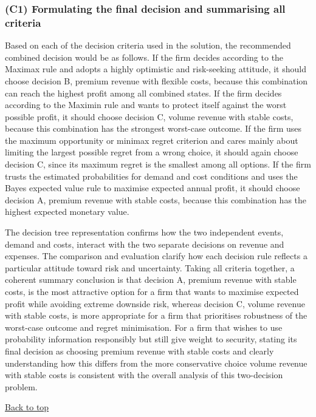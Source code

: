 \subsubsection{(C1) Formulating the final decision and summarising all criteria}\label{subsubsec:example3-c1}

Based on each of the decision criteria used in the solution, the recommended combined decision would be as follows. If the
firm decides according to the Maximax rule and adopts a highly optimistic and risk-seeking attitude, it should choose
decision B, premium revenue with flexible costs, because this combination can reach the highest profit among all combined
states. If the firm decides according to the Maximin rule and wants to protect itself against the worst possible profit, it
should choose decision C, volume revenue with stable costs, because this combination has the strongest worst-case outcome.
If the firm uses the maximum opportunity or minimax regret criterion and cares mainly about limiting the largest possible
regret from a wrong choice, it should again choose decision C, since its maximum regret is the smallest among all options.
If the firm trusts the estimated probabilities for demand and cost conditions and uses the Bayes expected value rule to
maximise expected annual profit, it should choose decision A, premium revenue with stable costs, because this combination
has the highest expected monetary value.

\medskip
The decision tree representation confirms how the two independent events, demand and costs, interact with the two separate
decisions on revenue and expenses. The comparison and evaluation clarify how each decision rule reflects a particular
attitude toward risk and uncertainty. Taking all criteria together, a coherent summary conclusion is that decision A,
premium revenue with stable costs, is the most attractive option for a firm that wants to maximise expected profit while
avoiding extreme downside risk, whereas decision C, volume revenue with stable costs, is more appropriate for a firm that
prioritises robustness of the worst-case outcome and regret minimisation. For a firm that wishes to use probability
information responsibly but still give weight to security, stating its final decision as choosing premium revenue with
stable costs and clearly understanding how this differs from the more conservative choice volume revenue with stable costs
is consistent with the overall analysis of this two-decision problem.

\medskip
\noindent\hyperref[sec:example3]{Back to top}
